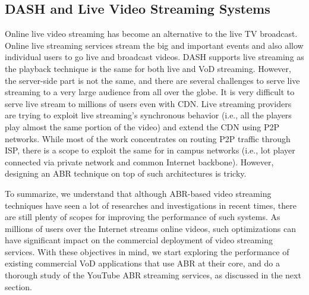 \subsection{DASH and Live Video Streaming Systems}
Online live video streaming has become an alternative to the live TV broadcast. Online live streaming services stream the big and important events and also allow individual users to go live and broadcast videos. DASH supports live streaming as the playback technique is the same for both live and VoD streaming. However, the server-side part is not the same, and there are several challenges to serve live streaming to a very large audience from all over the globe. It is very difficult to serve live stream to millions of users even with CDN. Live streaming providers are trying to exploit live streaming's synchronous behavior (i.e., all the players play almost the same portion of the video) and extend the CDN using P2P networks. While most of the work concentrates on routing P2P traffic through ISP, there is a scope to exploit the same for in campus networks (i.e., lot player connected via private network and common Internet backbone). However, designing an ABR technique on top of such architectures is tricky. 

To summarize, we understand that although ABR-based video streaming techniques have seen a lot of researches and investigations in recent times, there are still plenty of scopes for improving the performance of such systems. As millions of users over the Internet streams online videos, such optimizations can have significant impact on the commercial deployment of video streaming services. With these objectives in mind, we start exploring the performance of existing commercial VoD applications that use ABR at their core, and do a thorough study of the YouTube ABR streaming services, as discussed in the next section. 